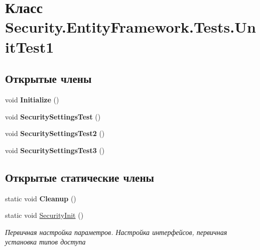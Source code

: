 \hypertarget{class_security_1_1_entity_framework_1_1_tests_1_1_unit_test1}{}\section{Класс Security.\+Entity\+Framework.\+Tests.\+Unit\+Test1}
\label{class_security_1_1_entity_framework_1_1_tests_1_1_unit_test1}
\subsection*{Открытые члены}
\begin{DoxyCompactItemize}
\item 
\mbox{\label{class_security_1_1_entity_framework_1_1_tests_1_1_unit_test1_a21a40281a4a84963457e00612bb46d89}} 
void {\bfseries Initialize} ()
\item 
\mbox{\label{class_security_1_1_entity_framework_1_1_tests_1_1_unit_test1_a615f644e49959c1a527d94d72c2e54ae}} 
void {\bfseries Security\+Settings\+Test} ()
\item 
\mbox{\label{class_security_1_1_entity_framework_1_1_tests_1_1_unit_test1_a6492f75a362962c914728b35a7761f50}} 
void {\bfseries Security\+Settings\+Test2} ()
\item 
\mbox{\label{class_security_1_1_entity_framework_1_1_tests_1_1_unit_test1_a5d38fc6202cc3224e21fafdf2285f397}} 
void {\bfseries Security\+Settings\+Test3} ()
\end{DoxyCompactItemize}
\subsection*{Открытые статические члены}
\begin{DoxyCompactItemize}
\item 
\mbox{\label{class_security_1_1_entity_framework_1_1_tests_1_1_unit_test1_a3608626253b39aa44839e560957eea2a}} 
static void {\bfseries Cleanup} ()
\item 
static void \hyperlink{class_security_1_1_entity_framework_1_1_tests_1_1_unit_test1_a1ea4c5d388f351649fae8c82c9318cda}{Security\+Init} ()
\begin{DoxyCompactList}\small\item\em Первичная настройка параметров. Настройка интерфейсов, первичная установка типов доступа \end{DoxyCompactList}\end{DoxyCompactItemize}


